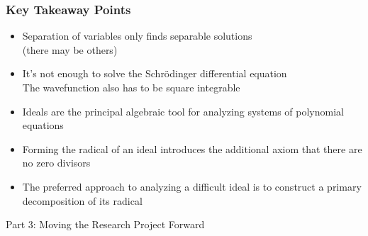 \documentclass{beamer}
\begin{document}
\begin{frame}
\frametitle{Key Takeaway Points}
\begin{itemize}
\item Separation of variables only finds separable solutions\\ (there may be others)
\item It's not enough to solve the Schr\"odinger differential equation\\The wavefunction also has to be square integrable
\item Ideals are the principal algebraic tool for analyzing systems of polynomial equations
\item Forming the radical of an ideal introduces the additional axiom that there are no zero divisors
\item The preferred approach to analyzing a difficult ideal
is to construct a primary decomposition of its radical
\end{itemize}
\end{frame}

\begin{frame}
\begin{exampleblock}{}
\begin{center}
\vskip 20pt
\Huge
Part 3: Moving the Research Project Forward
\vskip 6pt
\ 
\end{center}
\end{exampleblock}
\end{frame}
\end{document}
